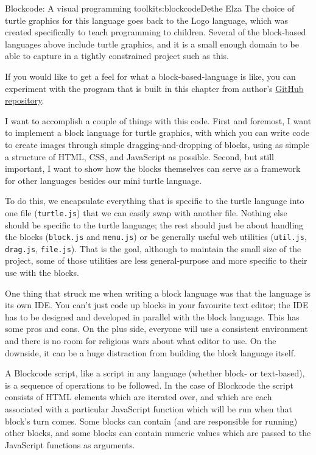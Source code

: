 \begin{aosachapter}{Blockcode: A visual programming toolkit}{s:blockcode}{Dethe Elza}
The choice of turtle graphics for this language goes back to the Logo
language, which was created specifically to teach programming to
children. Several of the block-based languages above include turtle
graphics, and it is a small enough domain to be able to capture in a
tightly constrained project such as this.

If you would like to get a feel for what a block-based-language is like,
you can experiment with the program that is built in this chapter from
author's \href{https://dethe.github.io/500lines/blockcode/}{GitHub
repository}.

\label{goals-and-structure}

I want to accomplish a couple of things with this code. First and
foremost, I want to implement a block language for turtle graphics, with
which you can write code to create images through simple
dragging-and-dropping of blocks, using as simple a structure of HTML,
CSS, and JavaScript as possible. Second, but still important, I want to
show how the blocks themselves can serve as a framework for other
languages besides our mini turtle language.

To do this, we encapsulate everything that is specific to the turtle
language into one file (\texttt{turtle.js}) that we can easily swap with
another file. Nothing else should be specific to the turtle language;
the rest should just be about handling the blocks (\texttt{block.js} and
\texttt{menu.js}) or be generally useful web utilities
(\texttt{util.js}, \texttt{drag.js}, \texttt{file.js}). That is the
goal, although to maintain the small size of the project, some of those
utilities are less general-purpose and more specific to their use with
the blocks.

One thing that struck me when writing a block language was that the
language is its own IDE. You can't just code up blocks in your favourite
text editor; the IDE has to be designed and developed in parallel with
the block language. This has some pros and cons. On the plus side,
everyone will use a consistent environment and there is no room for
religious wars about what editor to use. On the downside, it can be a
huge distraction from building the block language itself.

\label{the-nature-of-scripts}

A Blockcode script, like a script in any language (whether block- or
text-based), is a sequence of operations to be followed. In the case of
Blockcode the script consists of HTML elements which are iterated over,
and which are each associated with a particular JavaScript function
which will be run when that block's turn comes. Some blocks can contain
(and are responsible for running) other blocks, and some blocks can
contain numeric values which are passed to the JavaScript functions as
arguments.


\end{aosachapter}
